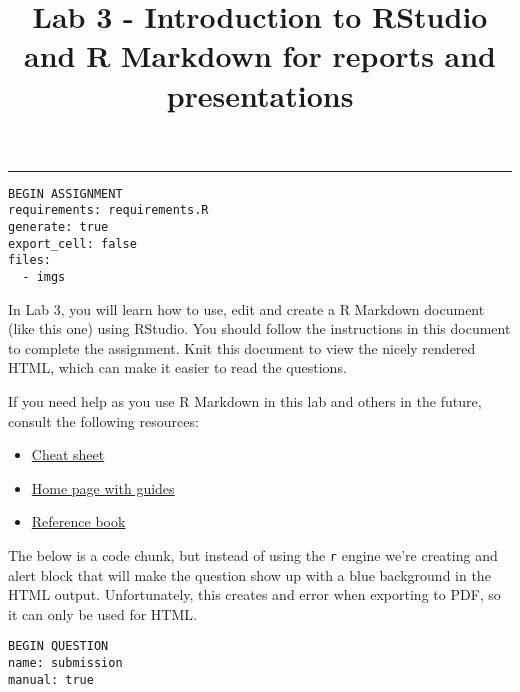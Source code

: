 \documentclass[
]{article}
\title{Lab 3 - Introduction to RStudio and R Markdown for reports and
presentations}
\author{}
\date{\vspace{-2.5em}}
\providecommand{\tightlist}{%
  \setlength{\itemsep}{0pt}\setlength{\parskip}{0pt}}
\begin{document}
\maketitle

\begin{center}\rule{0.5\linewidth}{0.5pt}\end{center}

\begin{verbatim}
BEGIN ASSIGNMENT
requirements: requirements.R
generate: true
export_cell: false
files: 
  - imgs
\end{verbatim}

In Lab 3, you will learn how to use, edit and create a R Markdown
document (like this one) using RStudio. You should follow the
instructions in this document to complete the assignment. Knit this
document to view the nicely rendered HTML, which can make it easier to
read the questions.

If you need help as you use R Markdown in this lab and others in the
future, consult the following resources:

\begin{itemize}
\tightlist
\item
  \href{https://rmarkdown.rstudio.com/lesson-15.html}{Cheat sheet}
\item
  \href{https://rmarkdown.rstudio.com/docs/}{Home page with guides}
\item
  \href{https://bookdown.org/yihui/rmarkdown/}{Reference book}
\end{itemize}

The below is a code chunk, but instead of using the \texttt{r} engine
we're creating and alert block that will make the question show up with
a blue background in the HTML output. Unfortunately, this creates and
error when exporting to PDF, so it can only be used for HTML.

\begin{verbatim}
BEGIN QUESTION
name: submission
manual: true
\end{verbatim}
\end{document}
